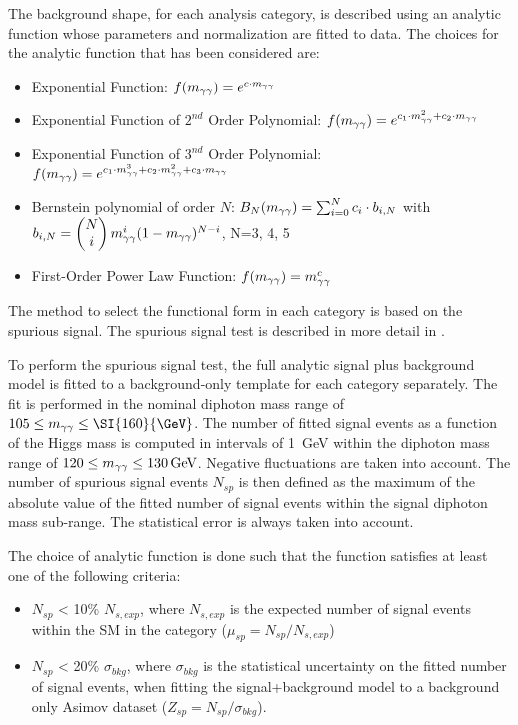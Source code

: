 The background \myy shape, for each analysis category, is described using an analytic function whose parameters and normalization are fitted to data. The choices for the analytic function that has been considered are:
\begin{itemize}
\item Exponential Function: $f(m_{\gamma\gamma}) = e^{c\cdot m_{\gamma\gamma}}$
\item Exponential Function of $2^{nd}$ Order Polynomial: $f(m_{\gamma\gamma}) = e^{c_1\cdot m^2_{\gamma\gamma}+c_2\cdot m_{\gamma\gamma}}$
\item Exponential Function of $3^{nd}$ Order Polynomial: $f(m_{\gamma\gamma}) = e^{c_1\cdot m^3_{\gamma\gamma}+c_2\cdot m^2_{\gamma\gamma}+c_3\cdot m_{\gamma\gamma}}$
\item Bernstein polynomial of order $N$: $B_{N}(m_{\gamma\gamma}) = \sum_{i=0}^N c_i\cdot b_{i,N}$ with $b_{i,N} = \begin{pmatrix}N\\i\end{pmatrix}m_{\gamma\gamma}^i (1-m_{\gamma\gamma})^{N-i}$, N=3, 4, 5
\item First-Order Power Law Function: $f(m_{\gamma\gamma}) = m_{\gamma\gamma}^c$
\end{itemize}
The method to select the functional form in each category is based on the spurious signal. The spurious signal test is described in more detail in \cite{Hasib:2238687}.

To perform the spurious signal test, the full analytic signal plus background model is fitted to a background-only template for each category separately. The fit is performed in the nominal diphoton mass range of $105 \leq \myy \leq \SI{160}{\GeV}$. The number of fitted signal events as a function of the Higgs mass is computed in intervals of \SI{1}{\GeV} within the diphoton mass range of $120 \leq m_{\gamma\gamma} \leq \SI{130}{GeV}$. Negative fluctuations are taken into account. The number of spurious signal events $N_{sp}$ is then defined as the maximum of the absolute value of the fitted number of signal events within the signal diphoton mass sub-range. The statistical error is always taken into account.

The choice of analytic function is done such that the function satisfies at least one of the following criteria:
\begin{itemize}
\item $N_{sp}$ < 10\% $N_{s,exp}$, where $N_{s,exp}$ is the expected number of signal events within the SM in the category ($\mu_{sp} = N_{sp} / N_{s,exp}$)
\item $N_{sp}$ < 20\% $\sigma_{bkg}$, where $\sigma_{bkg}$ is the statistical uncertainty on the fitted number of signal events, when fitting the signal+background model to a background only Asimov dataset ($Z_{sp} = N_{sp} / \sigma_{bkg}$).
\end{itemize}

